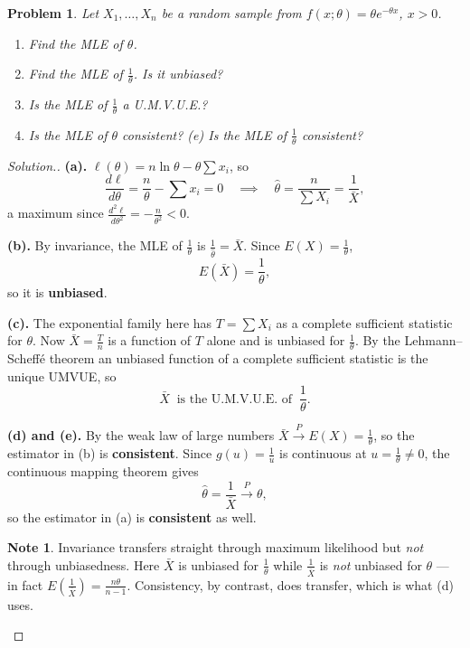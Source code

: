 \documentclass[12pt,a4paper]{report}
\theoremstyle{definition}
\newtheorem{note}[thm]{Note}
\theoremstyle{plain}
\newtheorem{problemx}{Problem}[section]
\newenvironment{problem}{\begin{problemx}}{\end{problemx}}
\newenvironment{solution}
  {\renewcommand{\qedsymbol}{}\begin{proof}[\textit{Solution}.]}
  {\end{proof}}
\begin{document}
\begin{problem}
Let $X_1,\ldots,X_n$ be a random sample from $f(x;\theta)=\theta e^{-\theta x}$,
$x>0$.
\begin{enumerate}
\item[(a).] Find the MLE of $\theta$.
\item[(b).] Find the MLE of $\frac{1}{\theta}$. Is it unbiased?
\item[(c).] Is the MLE of $\frac{1}{\theta}$ a U.M.V.U.E.?
\item[(d).] Is the MLE of $\theta$ consistent? \quad (e) Is the MLE of
$\frac{1}{\theta}$ consistent?
\end{enumerate}
\end{problem}

\begin{solution}
\textbf{(a).} $\ell(\theta)=n\ln\theta-\theta\sum x_i$, so
\[\frac{d\ell}{d\theta}=\frac{n}{\theta}-\sum x_i=0\quad\implies\quad
\hat\theta=\frac{n}{\sum X_i}=\frac{1}{\bar X},\]
a maximum since $\frac{d^2\ell}{d\theta^2}=-\frac{n}{\theta^2}<0$.

\textbf{(b).} By invariance, the MLE of $\frac{1}{\theta}$ is
$\frac{1}{\hat\theta}=\bar X$. Since $E(X)=\frac{1}{\theta}$,
\[E\left(\bar X\right)=\frac{1}{\theta},\]
so it is \textbf{unbiased}.

\textbf{(c).} The exponential family here has $T=\sum X_i$ as a complete sufficient
statistic for $\theta$. Now $\bar X=\frac{T}{n}$ is a function of $T$ alone and is
unbiased for $\frac{1}{\theta}$. By the Lehmann--Scheff\'e theorem an unbiased
function of a complete sufficient statistic is the unique UMVUE, so
\[\bar X\ \text{ is the U.M.V.U.E. of }\ \frac{1}{\theta}.\]

\textbf{(d) and (e).} By the weak law of large numbers $\bar X\xrightarrow{P}
E(X)=\frac{1}{\theta}$, so the estimator in (b) is \textbf{consistent}. Since
$g(u)=\frac{1}{u}$ is continuous at $u=\frac{1}{\theta}\neq 0$, the continuous
mapping theorem gives
\[\hat\theta=\frac{1}{\bar X}\xrightarrow{P}\theta,\]
so the estimator in (a) is \textbf{consistent} as well.

\begin{note}
Invariance transfers straight through maximum likelihood but \emph{not} through
unbiasedness. Here $\bar X$ is unbiased for $\frac{1}{\theta}$ while
$\frac{1}{\bar X}$ is \emph{not} unbiased for $\theta$ --- in fact
$E\left(\frac{1}{\bar X}\right)=\frac{n\theta}{n-1}$. Consistency, by contrast,
does transfer, which is what (d) uses.
\end{note}
\end{solution}
\end{document}
